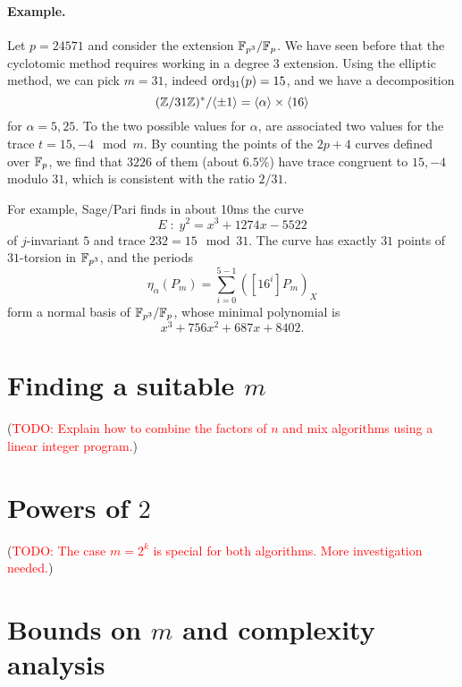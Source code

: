 \documentclass{article}
\newcommand{\todo}[1]{(\textcolor{red}{TODO: #1})}
\begin{document}
\paragraph{Example.}  Let $p=24571$ and consider the extension
$\mathbb{F}_{p^3}/\mathbb{F}_p$. We have seen before that the cyclotomic method
requires working in a degree $3$ extension. Using the elliptic method,
we can pick $m=31$, indeed $\operatorname{ord}_{31}(p)=15$, and we have a
decomposition
\begin{equation} 
  (\mathbb{Z}/31\mathbb{Z})^\ast/\langle\pm1\rangle =
  \langle\alpha\rangle\times\langle16\rangle
\end{equation} 
for $\alpha=5,25$. To the two possible values for $\alpha$, are
associated two values for the trace $t=15,-4\mod m$. By counting the
points of the $2p+4$ curves defined over $\mathbb{F}_p$, we find that $3226$
of them (about $6.5\%$) have trace congruent to $15,-4$ modulo $31$,
which is consistent with the ratio $2/31$.

For example, Sage/Pari finds in about 10ms the curve
\begin{equation}
  E \;:\; y^2 = x^3 + 1274x - 5522
\end{equation}
of $j$-invariant $5$ and trace $232=15 \mod 31$. The curve has exactly
$31$ points of $31$-torsion in $\mathbb{F}_{p^3}$, and the periods
\begin{equation}
  \eta_\alpha(P_m) = \sum_{i=0}^{5-1}([16^i]P_m)_X
\end{equation}
form a normal basis of $\mathbb{F}_{p^3}/\mathbb{F}_p$, whose minimal polynomial is
\begin{equation}
  x^3 + 756x^2 + 687x + 8402.
\end{equation}


\section{Finding a suitable $m$}

\todo{Explain how to combine the factors of $n$ and mix algorithms
  using a linear integer program.}

\section{Powers of $2$}

\todo{The case $m=2^k$ is special for both algorithms. More
  investigation needed.}


\section{Bounds on $m$ and complexity analysis}
\end{document}
